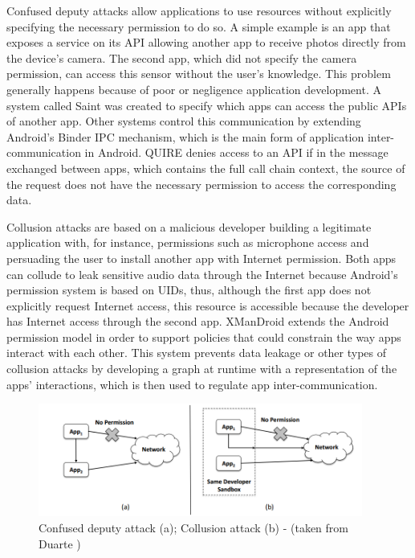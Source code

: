 Confused deputy attacks allow applications to use resources without explicitly specifying the necessary permission to do so. A simple example is an app that exposes a service on its API allowing another app to receive photos directly from the device's camera. The second app, which did not specify the camera permission, can access this sensor without the user's knowledge. This problem generally happens because of poor or negligence application development. A system  called Saint \cite{ongtang2012semantically} was created to specify which apps can access the public APIs of another app. Other systems control this communication by extending Android’s Binder \ac{IPC} mechanism, which is the main form of application inter-communication in Android. QUIRE \cite{dietz2011quire} denies access to an API if in the message exchanged between apps, which contains the full call chain context, the source of the request does not have the necessary permission to access the corresponding data.

Collusion attacks are based on a malicious developer building a legitimate application with, for instance, permissions such as microphone access and persuading the user to install another app with Internet permission. Both apps can collude to leak sensitive audio data through the Internet because Android's permission system is based on UIDs, thus, although the first app does not explicitly request Internet access, this resource is accessible because the developer has Internet access through the second app. XManDroid \cite{bugiel2011xmandroid} extends the Android permission model in order to support policies that could constrain the way apps interact with each other. This system prevents data leakage or other types of collusion attacks by developing a graph at runtime with a representation of the apps’ interactions, which is then used to regulate app inter-communication.

\begin{figure}[t!]
	\centering
	\includegraphics[width=0.95\textwidth]{img/communicationattacks.png}
	\caption{Confused deputy attack (a); Collusion attack (b) - (taken from Duarte \cite{nunoduarte})}
	\label{fig:communicationattacks}
\end{figure}

